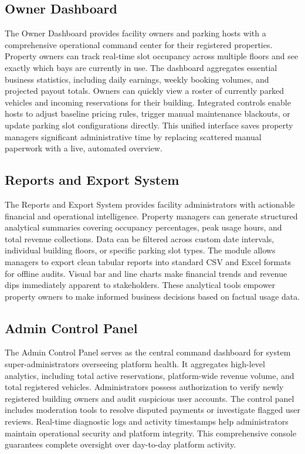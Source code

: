 \documentclass[12pt,a4paper]{article}
\begin{document}
\subsection{Owner Dashboard}
The Owner Dashboard provides facility owners and parking hosts with a comprehensive operational command center for their registered properties. Property owners can track real-time slot occupancy across multiple floors and see exactly which bays are currently in use. The dashboard aggregates essential business statistics, including daily earnings, weekly booking volumes, and projected payout totals. Owners can quickly view a roster of currently parked vehicles and incoming reservations for their building. Integrated controls enable hosts to adjust baseline pricing rules, trigger manual maintenance blackouts, or update parking slot configurations directly. This unified interface saves property managers significant administrative time by replacing scattered manual paperwork with a live, automated overview.

\subsection{Reports and Export System}
The Reports and Export System provides facility administrators with actionable financial and operational intelligence. Property managers can generate structured analytical summaries covering occupancy percentages, peak usage hours, and total revenue collections. Data can be filtered across custom date intervals, individual building floors, or specific parking slot types. The module allows managers to export clean tabular reports into standard CSV and Excel formats for offline audits. Visual bar and line charts make financial trends and revenue dips immediately apparent to stakeholders. These analytical tools empower property owners to make informed business decisions based on factual usage data.

\subsection{Admin Control Panel}
The Admin Control Panel serves as the central command dashboard for system super-administrators overseeing platform health. It aggregates high-level analytics, including total active reservations, platform-wide revenue volume, and total registered vehicles. Administrators possess authorization to verify newly registered building owners and audit suspicious user accounts. The control panel includes moderation tools to resolve disputed payments or investigate flagged user reviews. Real-time diagnostic logs and activity timestamps help administrators maintain operational security and platform integrity. This comprehensive console guarantees complete oversight over day-to-day platform activity.
\end{document}

